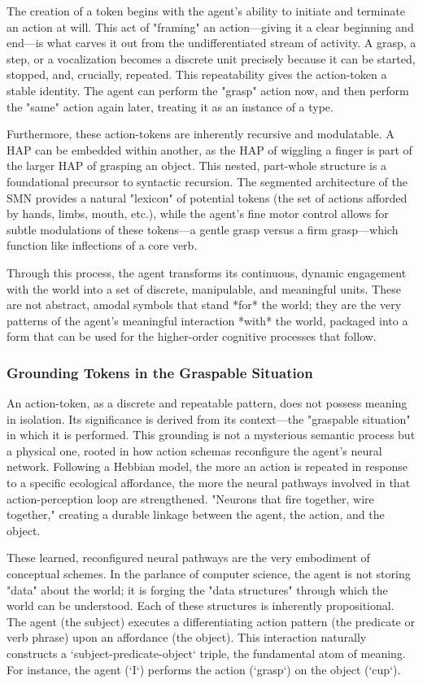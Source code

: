 The creation of a token begins with the agent's ability to initiate and terminate an action at will. This act of "framing" an action—giving it a clear beginning and end—is what carves it out from the undifferentiated stream of activity. A grasp, a step, or a vocalization becomes a discrete unit precisely because it can be started, stopped, and, crucially, repeated. This repeatability gives the action-token a stable identity. The agent can perform the "grasp" action now, and then perform the "same" action again later, treating it as an instance of a type.

Furthermore, these action-tokens are inherently recursive and modulatable. A HAP can be embedded within another, as the HAP of wiggling a finger is part of the larger HAP of grasping an object. This nested, part-whole structure is a foundational precursor to syntactic recursion. The segmented architecture of the SMN provides a natural "lexicon" of potential tokens (the set of actions afforded by hands, limbs, mouth, etc.), while the agent's fine motor control allows for subtle modulations of these tokens—a gentle grasp versus a firm grasp—which function like inflections of a core verb.

Through this process, the agent transforms its continuous, dynamic engagement with the world into a set of discrete, manipulable, and meaningful units. These are not abstract, amodal symbols that stand *for* the world; they are the very patterns of the agent's meaningful interaction *with* the world, packaged into a form that can be used for the higher-order cognitive processes that follow.

\subsubsection*{Grounding Tokens in the Graspable Situation}
An action-token, as a discrete and repeatable pattern, does not possess meaning in isolation. Its significance is derived from its context—the "graspable situation" in which it is performed. This grounding is not a mysterious semantic process but a physical one, rooted in how action schemas reconfigure the agent's neural network. Following a Hebbian model, the more an action is repeated in response to a specific ecological affordance, the more the neural pathways involved in that action-perception loop are strengthened. "Neurons that fire together, wire together," creating a durable linkage between the agent, the action, and the object.

These learned, reconfigured neural pathways are the very embodiment of conceptual schemes. In the parlance of computer science, the agent is not storing "data" about the world; it is forging the "data structures" through which the world can be understood. Each of these structures is inherently propositional. The agent (the subject) executes a differentiating action pattern (the predicate or verb phrase) upon an affordance (the object). This interaction naturally constructs a `subject-predicate-object` triple, the fundamental atom of meaning. For instance, the agent (`I`) performs the action (`grasp`) on the object (`cup`).

